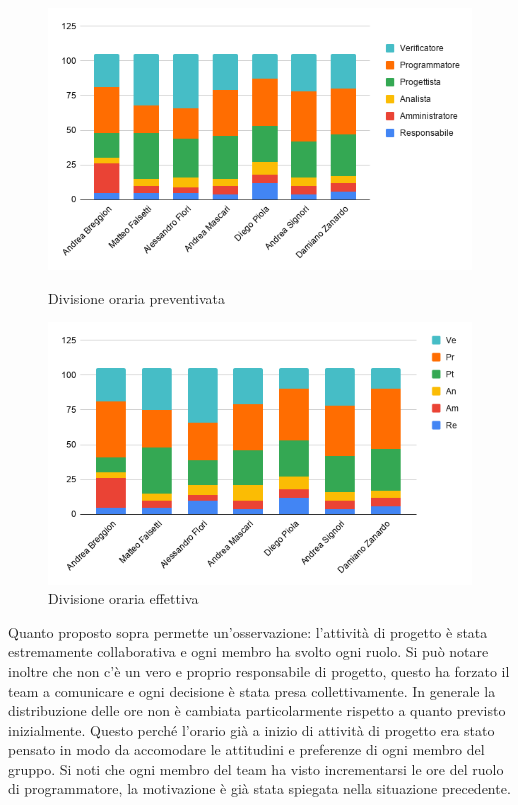             \begin{figure}[H]
                \centering
                \begin{minipage}[b]{0.4\textwidth}
                  \includegraphics[width=\textwidth]{source/img/no_investimento_orari.png}
                  \caption{Divisione oraria preventivata}
                \end{minipage}
                \hfill
                \begin{minipage}[b]{0.4\textwidth}
                  \includegraphics[width=\textwidth]{source/img/no_investimento_orari_effettivo.png}
                  \caption{Divisione oraria effettiva}
                \end{minipage}
            \end{figure}

            Quanto proposto sopra permette un'osservazione: l'attività di progetto è stata estremamente collaborativa e ogni membro ha svolto ogni ruolo. Si può notare inoltre che non c'è un vero e proprio responsabile di progetto, questo ha forzato il team a comunicare e ogni decisione è stata presa collettivamente.
            In generale la distribuzione delle ore non è cambiata particolarmente rispetto a quanto previsto inizialmente. Questo perché l'orario già a inizio di attività di progetto era stato pensato in modo da accomodare le attitudini e preferenze di ogni membro del gruppo. Si noti che ogni membro del team ha visto incrementarsi le ore del ruolo di programmatore, la motivazione è già stata spiegata nella situazione precedente.

       